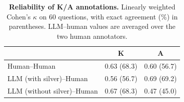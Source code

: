 \begin{table}[t]
\centering
\small
\caption{\textbf{Reliability of K/A annotations.}
Linearly weighted Cohen's $\kappa$ on 60 questions, with exact agreement (\%) in parentheses.
LLM--human values are averaged over the two human annotators.}
\label{tab:ka_reliability}
\begin{tabular}{@{}lcc@{}}
\toprule
 & \textbf{K} & \textbf{A} \\
\midrule
Human--Human                & 0.63 (68.3) & 0.60 (56.7) \\
LLM (with silver)--Human    & 0.56 (56.7) & 0.69 (69.2) \\
LLM (without silver)--Human & 0.67 (68.3) & 0.47 (45.0) \\
\bottomrule
\end{tabular}
\end{table}
